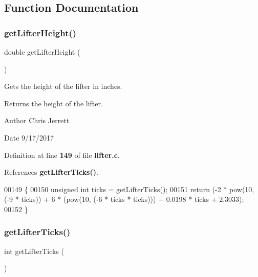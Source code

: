 \subsection{Function Documentation}
\mbox{\label{lifter_8c_a2719740958fd8a5926f88f6194e820e3}} 
\subsubsection{get\+Lifter\+Height()}
{\footnotesize\ttfamily double get\+Lifter\+Height (\begin{DoxyParamCaption}{ }\end{DoxyParamCaption})}



Gets the height of the lifter in inches. 

\begin{DoxyReturn}{Returns}
the height of the lifter. 
\end{DoxyReturn}
\begin{DoxyAuthor}{Author}
Chris Jerrett 
\end{DoxyAuthor}
\begin{DoxyDate}{Date}
9/17/2017 
\end{DoxyDate}


Definition at line \textbf{ 149} of file \textbf{ lifter.\+c}.



References \textbf{ get\+Lifter\+Ticks()}.


\begin{DoxyCode}
00149                          \{
00150   \textcolor{keywordtype}{unsigned} \textcolor{keywordtype}{int} ticks = getLifterTicks();
00151   \textcolor{keywordflow}{return} (-2 * pow(10, (-9 * ticks)) + 6 * (pow(10, (-6 * ticks * ticks))) + 0.0198 * ticks + 2.3033);
00152 \}
\end{DoxyCode}
\mbox{\label{lifter_8c_acdf909159b0406c48099843f2306be78}} 
\subsubsection{get\+Lifter\+Ticks()}
{\footnotesize\ttfamily int get\+Lifter\+Ticks (\begin{DoxyParamCaption}{ }\end{DoxyParamCaption})}



